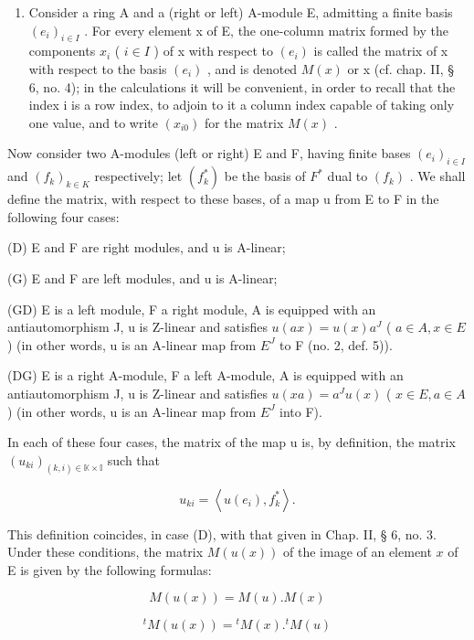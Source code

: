 \begin{enumerate}
\def\labelenumi{\Roman{enumi}.}
\setcounter{enumi}{1}
\tightlist
\item
  Consider a ring A and a (right or left) A-module E, admitting a finite basis \((e_{i})_{i\in I}\) . For every element x of E, the one-column matrix formed by the components \(x_{i}\) ( \(i\in I\) ) of x with respect to \((e_{i})\) is called the matrix of x with respect to the basis \((e_{i})\) , and is denoted \(M(x)\) or x (cf. chap. II, § 6, no. 4); in the calculations it will be convenient, in order to recall that the index i is a row index, to adjoin to it a column index capable of taking only one value, and to write \((x_{i0})\) for the matrix \(M(x)\) .
\end{enumerate}

Now consider two A-modules (left or right) E and F, having finite bases \((e_{i})_{i\in I}\) and \((f_{k})_{k\in K}\) respectively; let \((f_{k}^{*})\) be the basis of \(F^{*}\) dual to \((f_{k})\) . We shall define the matrix, with respect to these bases, of a map u from E to F in the following four cases:

(D) E and F are right modules, and u is A-linear;

(G) E and F are left modules, and u is A-linear;

(GD) E is a left module, F a right module, A is equipped with an antiautomorphism J, u is Z-linear and satisfies \(u(ax) = u(x)a^{J}\) ( \(a \in A, x \in E\) ) (in other words, u is an A-linear map from \(E^{J}\) to F (no. 2, def. 5)).

(DG) E is a right A-module, F a left A-module, A is equipped with an antiautomorphism J, u is Z-linear and satisfies \(u(xa) = a^{J}u(x)\) ( \(x \in E, a \in A\) ) (in other words, u is an A-linear map from \(E^{J}\) into F).

In each of these four cases, the matrix of the map u is, by definition, the matrix \((u_{ki})_{(k,i)\in\mathbb{K}\times\mathbb{I}}\) such that

\[
u _ {k i} = \left\langle u (e _ {i}), f _ {k} ^ {*} \right\rangle .\tag{44}
\]

This definition coincides, in case (D), with that given in Chap. II, § 6, no. 3. Under these conditions, the matrix \(M(u(x))\) of the image of an element \(x\) of E is given by the following formulas:

\[
M (u (x)) = M (u). M (x)\tag{45 D}
\]

\[
{ } ^ { t } M ( u ( x ) ) = { } ^ { t } M ( x ) . { } ^ { t } M ( u )\tag{45 G}
\]

